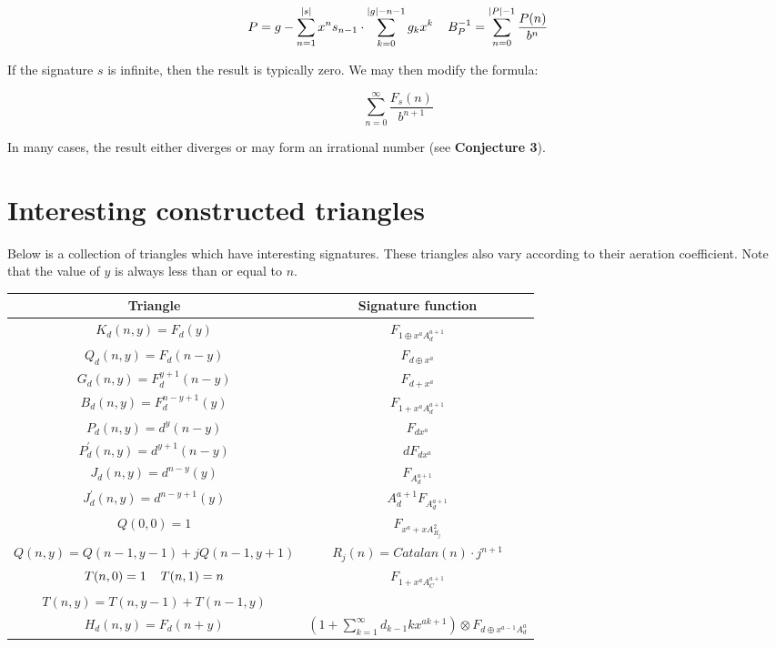 \documentclass{article}
\begin{document}
$$P = g - \sum_{n=1}^{|s|} x^n s_{n-1} \cdot \sum_{k=0}^{|g|-n-1} g_k x^k \hspace{4mm} B_P^{-1} = \sum_{n=0}^{|P|-1} \frac{P(n)}{b^n}$$

\noindent If the signature $s$ is infinite, then the result is typically zero. We may then modify the formula:

$$\sum_{n=0}^{\infty} \frac{F_{s}(n)}{b^{n+1}}$$

\noindent In many cases, the result either diverges or may form an irrational number (see \textbf{Conjecture 3}).

\pagebreak

\section{Interesting constructed triangles}

Below is a collection of triangles which have interesting signatures. These triangles also vary according to their aeration coefficient. Note that the value of $y$ is always less than or equal to $n$.

\begin{center}
\begin{tabular}{|c|c|}
\hline
Triangle & Signature function\\
\hline
$K_d (n, y) = F_d(y)$  & $F_{1 \oplus x^a A_d^{a+1}}$\\
\hline
$Q_d (n, y) = F_d(n-y)$ & $F_{d \oplus x^a}$\\
\hline
$G_d(n, y) = F_d^{y+1} (n-y)$ & $F_{d + x^{a}}$\\
\hline
$B_d(n, y) = F_d^{n-y+1}(y)$ & $F_{1 + x^{a}A_d^{a+1}}$\\
\hline
$P_d(n, y) = d^y(n-y)$ & $F_{dx^a}$\\
\hline
$P_d^{\prime}(n, y) = d^{y+1}(n-y)$ & $dF_{d x^a}$\\
\hline
$J_d(n, y) = d^{n-y}(y)$ & $F_{A_d^{a+1}}$\\
\hline
$J_d^{\prime}(n, y) = d^{n-y+1}(y)$ & $A_d^{a+1} F_{A_d^{a+1}}$\\
\hline
$Q(0, 0) = 1$ & $F_{x^a + xA_{R_j}^2}$\\
$Q(n, y) = Q(n-1, y-1) + jQ(n-1, y+1)$ & $R_j(n) = Catalan(n) \cdot j^{n+1}$\\
\hline
$T(n, 0) = 1 \hspace{4mm} T(n, 1) = n$ & $F_{1 + x^a A_C^{a+1}}$\\
$T(n, y) = T(n,y-1) + T(n-1, y)$ &\\
\hline
$H_d (n, y) = F_d(n+y)$ & $\left(1 + \sum_{k=1}^{\infty} d_{k-1} k x^{ak+1} \right) \otimes F_{d \oplus x^{a-1}A_d^{a}}$\\
\hline
\end{tabular}
\end{center}
\end{document}

